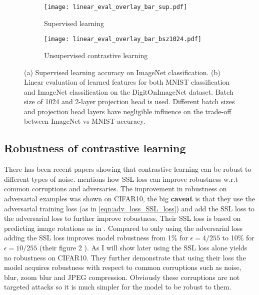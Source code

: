 \documentclass[../thesis.tex]{subfiles}
\begin{document}
	\begin{figure*}
		\centering
		\begin{subfigure}{.25\textwidth}
			\centering
			\texttt{[image: linear\_eval\_overlay\_bar\_sup.pdf]}
			\caption{\label{fig:linear_overlay_sup}Supervised learning}
		\end{subfigure}
		\begin{subfigure}{.695\textwidth}
			\centering
			\texttt{[image: linear\_eval\_overlay\_bar\_bsz1024.pdf]}
			\caption{\label{fig:linear_overlay_unsup}Unsupervised contrastive learning}
		\end{subfigure}
		\caption{
			(a) Supervised learning accuracy on ImageNet classification.
			(b) Linear evaluation of learned features for both MNIST classification and ImageNet classification on the DigitOnImageNet dataset. 
			Batch size of 1024 and 2-layer projection head is used. Different batch sizes and projection head layers have negligible influence on the trade-off between ImageNet vs MNIST accuracy.}
		\label{fig:simclr_shortcut_solution}
	\end{figure*}
	
	
	\subsection{Robustness of contrastive learning}
	\label{sec:Robustness_contrastive_learning}  
	
	There has been recent papers showing that contrastive learning can be robust to different types of noise. \cite{adv_training_plus_ssl_training} mentions how SSL loss can improve robustness w.r.t common corruptions and adversaries. The improvement in robustness on adversarial examples was shown on CIFAR10, the big \textbf{caveat} is that they use the adversarial training loss \cite{adv_training_madry} (as in \ref{eqn:adv_loss_SSL_loss}) and add the SSL loss to the adversarial loss to further improve robustness. Their SSL loss is based on predicting image rotations as in \cite{rotation_gidaris_unsupervised_2018}. Compared to only using the adversarial loss adding the SSL loss improves model robustness from 1\% for $\epsilon =4/255$ to 10\% for $\epsilon=10/255$ (their figure 2 ). As I will show later using the SSL loss alone yields no robustness on CIFAR10. They further demonstrate that using their loss the model acquires robustness with respect to common corruptions such as noise, blur, zoom blur and JPEG compression. Obviously these corruptions are not targeted attacks so it is much simpler for the model to be robust to them.
	
\end{document}

